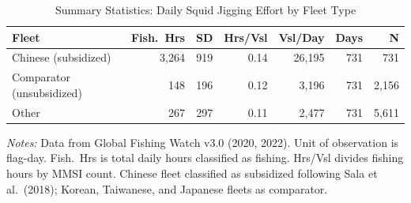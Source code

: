\begin{table}[!ht]
\centering
\caption{Summary Statistics: Daily Squid Jigging Effort by Fleet Type}
\label{tab:tab:summary}
\begin{threeparttable}
\small
\begin{tabular}{lrrrrrr}
\toprule
Fleet & Fish.\ Hrs & SD & Hrs/Vsl & Vsl/Day & Days & N\\
\midrule
Chinese (subsidized) & 3,264 & 919 & 0.14 & 26,195 & 731 & 731\\
Comparator (unsubsidized) & 148 & 196 & 0.12 & 3,196 & 731 & 2,156\\
Other & 267 & 297 & 0.11 & 2,477 & 731 & 5,611\\
\bottomrule
\end{tabular}
\begin{tablenotes}[flushleft]
\small
\item \textit{Notes:} Data from Global Fishing Watch v3.0 (2020, 2022). Unit of observation is flag-day. Fish.\ Hrs is total daily hours classified as fishing. Hrs/Vsl divides fishing hours by MMSI count. Chinese fleet classified as subsidized following Sala et al.\ (2018); Korean, Taiwanese, and Japanese fleets as comparator.
\end{tablenotes}
\end{threeparttable}
\end{table}
